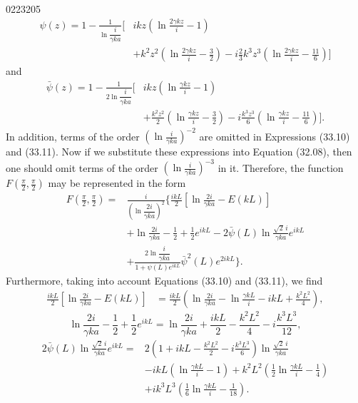 \begin{scanpage}{0223}{205}
\[\begin{aligned}
\psi(z)=1-\frac1{\ln\dfrac{i}{\gamma ka}}\Biggl[&ikz\left(\ln\frac{2\gamma kz}i-1\right)\\
&+k^2z^2\left(\ln\frac{2\gamma kz}i-\frac32\right)-i\frac23k^3z^3\left(\ln\frac{2\gamma kz}i-\frac{11}6\right)\Biggr]
\end{aligned}\tag{33.10}\]
and
\[\begin{aligned}
\bar\psi(z)=1-\frac1{2\ln\dfrac{i}{\gamma ka}}\Biggl[&ikz\left(\ln\frac{\gamma kz}i-1\right)\\
&+\frac{k^2z^2}2\left(\ln\frac{\gamma kz}i-\frac32\right)-i\frac{k^3z^3}6\left(\ln\frac{\gamma kz}i-\frac{11}6\right)\Biggr].
\end{aligned}\tag{33.11}\]
In addition, terms of the order $\left(\ln\frac{i}{\gamma ka}\right)^{-2}$ are omitted in Expressions (33.10) and (33.11). Now if we substitute these expressions into Equation (32.08), then one should omit terms of the order $\left(\ln\frac{i}{\gamma ka}\right)^{-3}$ in it. Therefore, the function $F\left(\frac\pi2,\frac\pi2\right)$ may be represented in the form
\[\begin{aligned}
F\left(\frac\pi2,\frac\pi2\right)={}&\frac{i}{\left(\ln\dfrac{2i}{\gamma ka}\right)^2}\Biggl\{\frac{ikL}2\left[\ln\frac{2i}{\gamma ka}-E(kL)\right]\\
&+\ln\frac{2i}{\gamma ka}-\frac12+\frac12e^{ikL}-2\bar\psi(L)\ln\frac{\sqrt2\,i}{\gamma ka}e^{ikL}\\
&+\frac{2\ln\dfrac{i}{\gamma ka}}{1+\psi(L)e^{ikL}}\bar\psi^2(L)e^{2ikL}\Biggr\}.
\end{aligned}\tag{33.12}\]
Furthermore, taking into account Equations (33.10) and (33.11), we find
\[\begin{aligned}
\frac{ikL}2\left[\ln\frac{2i}{\gamma ka}-E(kL)\right]
&=\frac{ikL}2\left(\ln\frac{2i}{\gamma ka}-\ln\frac{\gamma kL}i-ikL+\frac{k^2L^2}4\right),
\end{aligned}\tag{33.13}\]
\[\ln\frac{2i}{\gamma ka}-\frac12+\frac12e^{ikL}
=\ln\frac{2i}{\gamma ka}+\frac{ikL}2-\frac{k^2L^2}4-i\frac{k^3L^3}{12},\tag{33.14}\]
\[\begin{aligned}
2\bar\psi(L)\ln\frac{\sqrt2\,i}{\gamma ka}e^{ikL}={}&2\left(1+ikL-\frac{k^2L^2}2-i\frac{k^3L^3}6\right)\ln\frac{\sqrt2\,i}{\gamma ka}\\
&-ikL\left(\ln\frac{\gamma kL}i-1\right)+k^2L^2\left(\frac12\ln\frac{\gamma kL}i-\frac14\right)\\
&+ik^3L^3\left(\frac16\ln\frac{\gamma kL}i-\frac1{18}\right).
\end{aligned}\tag{33.15}\]
\end{scanpage}
